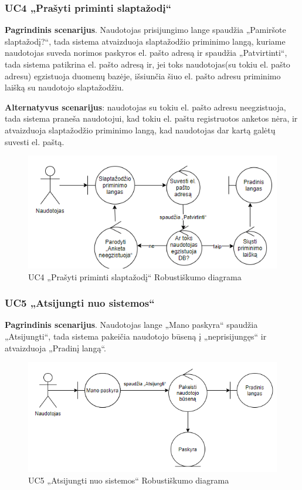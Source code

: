 \documentclass{VUMIFPSbakalaurinis}
\begin{document}
\subsubsection{UC4 „Prašyti priminti slaptažodį“}
\textbf{Pagrindinis scenarijus}. Naudotojas prisijungimo lange spaudžia „Pamiršote slaptažodį?“, tada sistema atvaizduoja slaptažodžio priminimo langą, kuriame naudotojas suveda norimos paskyros el. pašto adresą ir spaudžia „Patvirtinti“, tada sistema patikrina el. pašto adresą ir, jei toks naudotojas(su tokiu el. pašto adresu) egzistuoja duomenų bazėje, išsiunčia šiuo el. pašto adresu priminimo laišką su naudotojo slaptažodžiu. 
\par \textbf{Alternatyvus scenarijus}: naudotojas su tokiu el. pašto adresu neegzistuoja, tada sistema praneša naudotojui, kad tokiu el. paštu registruotos anketos nėra, ir atvaizduoja slaptažodžio priminimo langą, kad naudotojas dar kartą galėtų suvesti el. paštą.

\begin{figure}[H]
	\centering
	\includegraphics[scale=0.6]{img/Robustness/UC4}
	\caption{UC4 „Prašyti priminti slaptažodį“ Robustiškumo diagrama}
	\label{img:uc4rob}
\end{figure}

\subsubsection{UC5 „Atsijungti nuo sistemos“}
\textbf{Pagrindinis scenarijus}. Naudotojas lange „Mano paskyra“ spaudžia „Atsijungti“, tada sistema pakeičia naudotojo būseną į „neprisijungęs“ ir atvaizduoja „Pradinį langą“.

\begin{figure}[H]
	\centering
	\includegraphics[scale=0.6]{img/Robustness/UC5}
	\caption{UC5 „Atsijungti nuo sistemos“ Robustiškumo diagrama}
	\label{img:uc5rob}
\end{figure}
\end{document}
